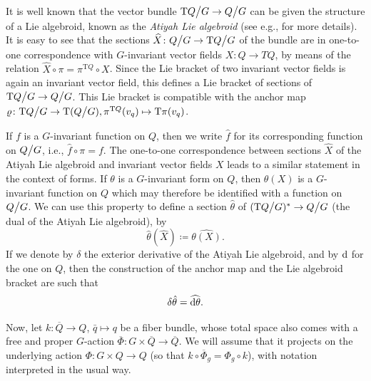\documentclass[11pt]{article}
\theoremstyle{plain}
\theoremstyle{definition}
\begin{document}
It is well known that the vector bundle $\mathrm{T}Q \big\slash G\to Q\big\slash G$ can be given the structure of a Lie algebroid, known as the \emph{Atiyah Lie algebroid} (see e.g., \cite{deleon2005survey,mackenzie1987algebroid} for more details). It is easy to see that the sections $\widehat{X}\colon Q\big\slash G \to \mathrm{T}Q \big\slash G$ of the bundle are in one-to-one correspondence with $G$-invariant vector fields $X\colon Q \to TQ$, by means of the relation $\widehat{X} \circ \pi = \pi^{\mathrm{T}Q}\circ X$. Since the Lie bracket of two invariant vector fields is again an invariant vector field, this defines a Lie bracket of sections of $\mathrm{T}Q \big\slash G\to Q\big\slash G$. This Lie bracket is compatible with the anchor map  $\varrho \colon \mathrm{T}Q\big\slash G\to \mathrm{T}(Q\big\slash G), \pi^{\mathrm{T}Q}(v_{q})\mapsto \mathrm{T}\pi(v_q)$.

If $f$ is a $G$-invariant function on $Q$, then we write $\hat f$ for its corresponding function on $Q\big\slash G$, i.e., $\hat f\circ\pi = f$. The one-to-one correspondence between sections $\widehat{X}$ of the Atiyah Lie algebroid and invariant vector fields $X$ leads to a similar statement in the context of forms. If $\theta$ is a $G$-invariant form on $Q$, then $\theta(X)$ is a $G$-invariant function on $Q$ which may therefore be identified with a function on $Q\big\slash G$. We can use this property to define a section $\hat\theta$ of $(\mathrm{T}Q\big\slash G)^{\ast} \to Q\big\slash G$ (the dual of the Atiyah Lie algebroid), by
\begin{equation*}
    \hat\theta(\widehat{X})\coloneqq \widehat{\theta(X)}.
\end{equation*}
If we denote by $\delta$ the exterior derivative of the Atiyah Lie algebroid, and by $\rm{d}$ for the one on $Q$, then the construction of the anchor map and the Lie algebroid bracket are such that
\begin{equation*}
    \delta\hat\theta = \widehat{\rm{d}\theta}.
\end{equation*}

Now, let $k\colon \overline{Q}\to Q$, $\bar{q}\mapsto q$ be a fiber bundle, whose total space also comes with a free and proper $G$-action $\overline{\Phi}\colon G\times \overline{Q}\to \overline{Q}$. We will assume that it projects on the underlying action $\Phi\colon G\times Q\to Q$ (so that $k\circ \overline{\Phi}_g=\Phi_g\circ k$), with notation interpreted in the usual way.
\end{document}
